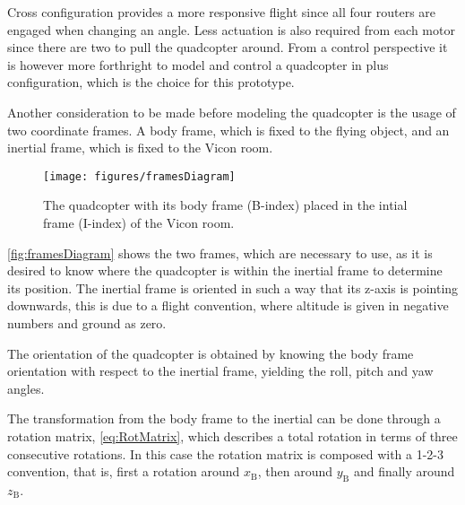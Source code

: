 Cross configuration provides a more responsive flight since all four routers are engaged when changing an angle. Less actuation is also required from each motor since there are two to pull the quadcopter around. From a control perspective it is however more forthright to model and control a quadcopter in plus configuration, which is the choice for this prototype. \cite{HLChan}

Another consideration to be made before modeling the quadcopter is the usage of two coordinate frames. A body frame, which is fixed to the flying object, and an inertial frame, which is fixed to the Vicon room. 
%
\begin{figure}[H]
    \centering
    \texttt{[image: figures/framesDiagram]}
    \caption{The quadcopter with its body frame (B-index) placed in the intial frame (I-index) of the Vicon room. }
    \label{fig:framesDiagram}
\end{figure}

\autoref{fig:framesDiagram} shows the two frames, which are necessary to use, as it is desired to know where the quadcopter is within the inertial frame to determine its position. The inertial frame is oriented in such a way that its z-axis is pointing downwards, this is due to a flight convention, where altitude is given in negative numbers and ground as zero. 

The orientation of the quadcopter is obtained by knowing the body frame orientation with respect to the inertial frame, yielding the roll, pitch and yaw angles. 

The transformation from the body frame to the inertial can be done through a rotation matrix, \autoref{eq:RotMatrix}, which describes a total rotation in terms of three consecutive rotations. In this case the rotation matrix is composed with a 1-2-3 convention, that is, first a rotation around $x_{\mathrm{B}}$, then around $y_{\mathrm{B}}$ and finally around $z_{\mathrm{B}}$.

